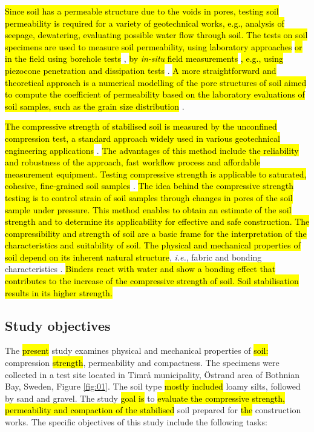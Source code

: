 \documentclass{amestyle}
\begin{document}
\hl{Since soil has a permeable structure due to the voids in pores, testing soil permeability is required for a variety of geotechnical works, e.g., analysis of seepage, dewatering, evaluating possible water flow through soil. The tests on soil specimens are used to measure soil permeability, using laboratory approaches} \cite{ELHAKIM20162631} \hl{or in the field using borehole tests} \cite{YU2022127817}, \hl{by \emph{in-situ} field measurements} \cite{ZHOU201999}\hl{, e.g., using piezocone penetration and dissipation tests} \cite{TAKAI2016277,LIM2019189}. \hl{A more straightforward and theoretical approach is a numerical modelling of the pore structures of soil aimed to compute the coefficient of permeability based on the laboratory evaluations of soil samples, such as the grain size distribution} \cite{LIU2021104468}.

\hl{The compressive strength of stabilised soil is measured by the unconfined compression test, a standard approach widely used in various geotechnical engineering applications} \cite{SHIBI20211123,KARDANI2021100591}. \hl{The advantages of this method include the reliability and robustness of the approach, fast workflow process and affordable measurement equipment. Testing compressive strength is applicable to saturated, cohesive, fine-grained soil samples} \cite{MOUSAVI2021104890,AHMED201527}. \hl{The idea behind the compressive strength testing is to control strain of soil samples through changes in pores of the soil sample under pressure. This method enables to obtain an estimate of the soil strength and to determine its applicability for effective and safe construction. The compressibility and strength of soil are a basic frame for the interpretation of the characteristics and suitability of soil. The physical and mechanical properties of soil depend on its inherent natural structure}, \emph{i.e.}, fabric and bonding characteristics \cite{Burland}. \hl{Binders react with water and show a bonding effect that contributes to the increase of the compressive strength of soil. Soil stabilisation results in its higher strength.}

\subsection{Study objectives} 
The \hl{present} study examines physical and mechanical properties of \hl{soil:} compression \hl{strength}, permeability and compactness. The specimens were collected in a test site located in Timrå municipality, Östrand area of Bothnian Bay, Sweden, Figure \ref{fig:01}. The soil type \hl{mostly included} loamy silts, followed by sand and gravel. The study \hl{goal is} to \hl{evaluate the compressive strength, permeability and compaction of the stabilised} soil prepared for \hl{the} construction works. The specific objectives of this study include the following tasks:
\end{document}
